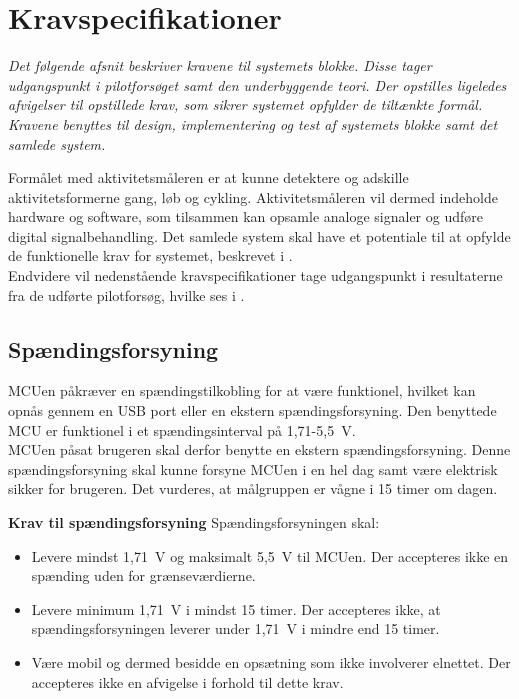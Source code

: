 \section{Kravspecifikationer}\label{Sec:krav}
\textit{Det følgende afsnit beskriver kravene til systemets blokke. Disse tager udgangspunkt i pilotforsøget samt den underbyggende teori. Der opstilles ligeledes afvigelser til opstillede krav, som sikrer systemet opfylder de tiltænkte formål. Kravene benyttes til design, implementering og test af systemets blokke samt det samlede system.}

Formålet med aktivitetsmåleren er at kunne detektere og adskille aktivitetsformerne gang, løb og cykling. Aktivitetsmåleren vil dermed indeholde hardware og software, som tilsammen kan opsamle analoge signaler og udføre digital signalbehandling. Det samlede system skal have et potentiale til at opfylde de funktionelle krav for systemet, beskrevet i . \\
Endvidere vil nedenstående kravspecifikationer tage udgangspunkt i resultaterne fra de udførte pilotforsøg, hvilke ses i .

\subsection{Spændingsforsyning} \label{krav_spaendingsf}
MCUen påkræver en spændingstilkobling for at være funktionel, hvilket kan opnås gennem en USB port eller en ekstern spændingsforsyning. Den benyttede MCU er funktionel i et spændingsinterval på 1,71-5,5~V.\\
MCUen påsat brugeren skal derfor benytte en ekstern spændingsforsyning. Denne spændingsforsyning skal kunne forsyne MCUen i en hel dag samt være elektrisk sikker for brugeren. Det vurderes, at målgruppen er vågne i 15 timer om dagen. %

\textbf{Krav til spændingsforsyning} \newline 
Spændingsforsyningen skal:
\begin{itemize}
	\item Levere mindst 1,71~V og maksimalt 5,5~V til MCUen. Der accepteres ikke en spænding uden for grænseværdierne.
	\item Levere minimum 1,71~V i mindst 15 timer. Der accepteres ikke, at spændingsforsyningen leverer under 1,71~V i mindre end 15 timer.
	\item Være mobil og dermed besidde en opsætning som ikke involverer elnettet. Der accepteres ikke en afvigelse i forhold til dette krav.
\end{itemize}

